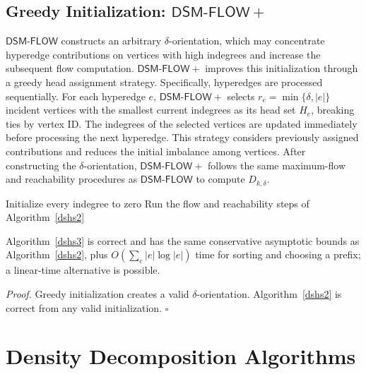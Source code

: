 \documentclass[twocolumn]{svjour3}
\newcommand{\kw}[1]{{\ensuremath{\mathsf{#1}}}\xspace}
\begin{document}
\subsection{Greedy Initialization: $\kw{DSM\text{-}FLOW+}$}
\kw{DSM\text{-}FLOW} constructs an arbitrary $\delta$-orientation, which may concentrate hyperedge contributions on vertices with high indegrees and increase the subsequent flow computation. \kw{DSM\text{-}FLOW+} improves this initialization through a greedy head assignment strategy.
Specifically, hyperedges are processed sequentially. For each hyperedge $e$, \kw{DSM\text{-}FLOW+} selects $r_e=\min\{\delta,|e|\}$ incident vertices with the smallest current indegrees as its head set $H_e$, breaking ties by vertex ID. The indegrees of the selected vertices are updated immediately before processing the next hyperedge. This strategy considers previously assigned contributions and reduces the initial imbalance among vertices. After constructing the $\delta$-orientation, \kw{DSM\text{-}FLOW+} follows the same maximum-flow and reachability procedures as \kw{DSM\text{-}FLOW} to compute $D_{k,\delta}$. 

\begin{algorithm}[t]
\small
\caption{$\kw{DSM\text{-}FLOW+}(\mathcal H,k,\delta)$}\label{dshs3}
Initialize every indegree to zero\;
Run the flow and reachability steps of Algorithm~\ref{dshs2}\;
\;
\end{algorithm}
\begin{theorem}[Complexity of $\kw{DSM\text{-}FLOW+}$]\label{comflowplus}
Algorithm~\ref{dshs3} is correct and has the same conservative asymptotic bounds as Algorithm~\ref{dshs2}, plus $O(\sum_e |e|\log |e|)$ time for sorting and choosing a prefix; a linear-time alternative is possible.
\end{theorem}
\emph{Proof.} Greedy initialization creates a valid $\delta$-orientation. Algorithm~\ref{dshs2} is correct from any valid initialization. \hfill$\square$





\section{Density Decomposition Algorithms}
\label{sec:two-algorithms}
\end{document}
